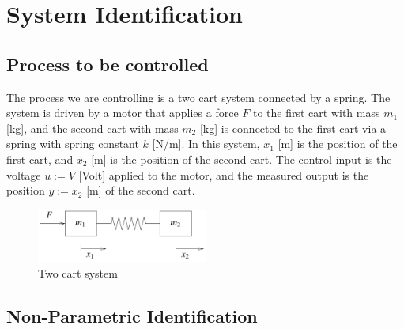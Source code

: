 \documentclass[11pt]{article}
\begin{document}
\label{sec:intro}


\newpage
\section{System Identification}
\label{sec:systemID}


\subsection{Process to be controlled}

The process we are controlling is a two cart system
connected by a spring. The system is driven by a motor that
applies a force $F$ to the first cart with mass $m_1$ [kg], and the second cart
with mass $m_2$ [kg] is connected to the first cart via a spring with spring constant $k$ [N/m].
In this system, $x_1$ [m] is the position of the first cart, and $x_2$ [m] is the position of the second cart.
The control input is the voltage $u := V$ [Volt] applied to the motor, and the measured output
is the position $y := x_2$ [m] of the second cart.
\begin{figure}[!ht]
\centering
\includegraphics[width=0.5\textwidth]{two-cart-system.png}
\caption{Two cart system}
\label{fig:two-cart-system}
\end{figure}

\subsection{Non-Parametric Identification}
\end{document}
